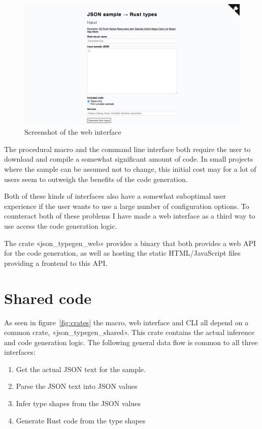 \begin{figure}[ht!]
\includegraphics[width=\textwidth]{json_typegen_web}
\hspace*{-1.5in} %
\caption{Screenshot of the web interface}
\label{fig:web-screenshot}
\end{figure}

The procedural macro and the command line interface both require the user to download and compile a somewhat significant amount of code. In small projects where the sample can be assumed not to change, this initial cost may for a lot of users seem to outweigh the benefits of the code generation.

Both of these kinds of interfaces also have a somewhat suboptimal user experience if the user wants to use a large number of configuration options. To counteract both of these problems I have made a web interface as a third way to use access the code generation logic.

The crate «json_typegen_web» provides a binary that both provides a web API for the code generation, as well as hosting the static HTML/JavaScript files providing a frontend to this API.

\section{Shared code}
\label{sec:shared-code}

As seen in figure~\ref{fig:crates} the macro, web interface and CLI all depend on a common crate, «json_typegen_shared». This crate contains the actual inference and code generation logic. The following general data flow is common to all three interfaces:

\begin{enumerate}
  \item Get the actual JSON text for the sample.
  \item Parse the JSON text into JSON values
  \item Infer type shapes from the JSON values
  \item Generate Rust code from the type shapes
\end{enumerate}

